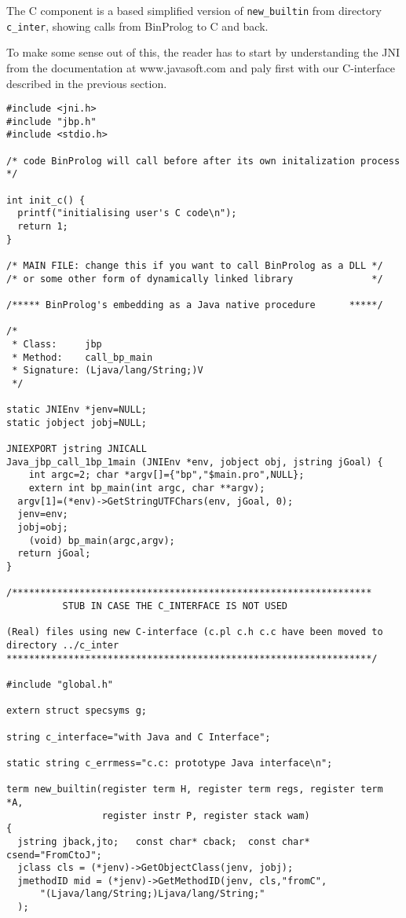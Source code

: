 \documentclass{article}
\begin{document}
The C component is a based simplified version of {\tt new\_builtin} from 
directory {\tt c\_inter}, showing calls from BinProlog to C and back.

To make some sense out of this, the reader has to start by understanding
the JNI from the documentation 
at www.javasoft.com and paly first with our C-interface described
in the previous section.

{\small \begin{verbatim}
#include <jni.h>
#include "jbp.h"
#include <stdio.h>

/* code BinProlog will call before after its own initalization process */

int init_c() {
  printf("initialising user's C code\n");
  return 1;
}

/* MAIN FILE: change this if you want to call BinProlog as a DLL */
/* or some other form of dynamically linked library              */

/***** BinProlog's embedding as a Java native procedure      *****/

/*
 * Class:     jbp
 * Method:    call_bp_main
 * Signature: (Ljava/lang/String;)V
 */

static JNIEnv *jenv=NULL;
static jobject jobj=NULL;

JNIEXPORT jstring JNICALL 
Java_jbp_call_1bp_1main (JNIEnv *env, jobject obj, jstring jGoal) {
	int argc=2; char *argv[]={"bp","$main.pro",NULL};
	extern int bp_main(int argc, char **argv);
  argv[1]=(*env)->GetStringUTFChars(env, jGoal, 0);
  jenv=env;
  jobj=obj;
	(void) bp_main(argc,argv);
  return jGoal;
}

/****************************************************************
          STUB IN CASE THE C_INTERFACE IS NOT USED

(Real) files using new C-interface (c.pl c.h c.c have been moved to 
directory ../c_inter
*****************************************************************/

#include "global.h"

extern struct specsyms g;

string c_interface="with Java and C Interface";

static string c_errmess="c.c: prototype Java interface\n";

term new_builtin(register term H, register term regs, register term *A,
                 register instr P, register stack wam)
{
  jstring jback,jto;   const char* cback;  const char* csend="FromCtoJ";
  jclass cls = (*jenv)->GetObjectClass(jenv, jobj);
  jmethodID mid = (*jenv)->GetMethodID(jenv, cls,"fromC", 
	  "(Ljava/lang/String;)Ljava/lang/String;"
  );
  

\end{verbatim}}
\end{document}

